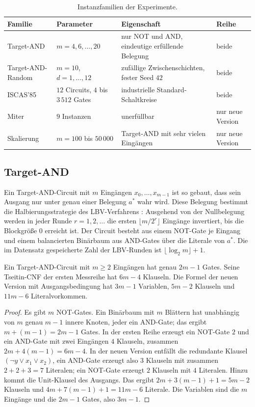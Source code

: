 \begin{table}[!ht]
	\centering
	\small
	\begin{tabularx}{\textwidth}{@{}L{3.3cm}L{3.0cm}YL{2.6cm}@{}}
		\toprule
		Familie & Parameter & Eigenschaft & Reihe \\
		\midrule
		Target-AND & $m=4,6,\ldots,20$ & nur NOT und AND, eindeutige erfüllende Belegung & beide \\
		Target-AND-Random & $m=10$, $d=1,\ldots,12$ & zufällige Zwischenschichten, fester Seed $42$ & beide \\
		ISCAS'85 & $12$ Circuits, $4$ bis $3\,512$ Gates & industrielle Standard-Schaltkreise & beide \\
		Miter & $9$ Instanzen & unerfüllbar & nur neue Version \\
		Skalierung & $m=100$ bis $50\,000$ & Target-AND mit sehr vielen Eingängen & nur neue Version \\
		\bottomrule
	\end{tabularx}
	\caption{Instanzfamilien der Experimente.}
	\label{tab:exp_familien}
\end{table}

\subsection{Target-AND}

Ein Target-AND-Circuit mit $m$ Eingängen $x_0,\ldots,x_{m-1}$ ist so gebaut, dass sein Ausgang nur unter genau einer Belegung $a^\ast$ wahr wird. Diese Belegung bestimmt die Halbierungsstrategie des LBV-Verfahrens \cite{epp2013}: Ausgehend von der Nullbelegung werden in jeder Runde $r=1,2,\ldots$ die ersten $\lfloor m/2^r\rfloor$ Eingänge invertiert, bis die Blockgröße $0$ erreicht ist. Der Circuit besteht aus einem NOT-Gate je Eingang und einem balancierten Binärbaum aus AND-Gates über die Literale von $a^\ast$. Die im Datensatz gespeicherte Zahl der LBV-Runden ist $\lfloor\log_2 m\rfloor+1$.

\begin{satz}
	\label{satz:exp_groesse}
	Ein Target-AND-Circuit mit $m\ge2$ Eingängen hat genau $2m-1$ Gates. Seine Tseitin-CNF der ersten Messreihe hat $6m-4$ Klauseln. Die Formel der neuen Version mit Ausgangsbedingung hat $3m-1$ Variablen, $5m-2$ Klauseln und $11m-6$ Literalvorkommen.
\end{satz}

\begin{proof}
	Es gibt $m$ NOT-Gates. Ein Binärbaum mit $m$ Blättern hat unabhängig von $m$ genau $m-1$ innere Knoten, jeder ein AND-Gate; das ergibt $m+(m-1)=2m-1$ Gates. In der ersten Reihe erzeugt ein NOT-Gate $2$ und ein AND-Gate mit zwei Eingängen $4$ Klauseln, zusammen $2m+4(m-1)=6m-4$. In der neuen Version entfällt die redundante Klausel $(\neg y\vee x_1\vee x_2)$, ein AND-Gate erzeugt also $3$ Klauseln mit zusammen $2+2+3=7$ Literalen; ein NOT-Gate erzeugt $2$ Klauseln mit $4$ Literalen. Hinzu kommt die Unit-Klausel des Ausgangs. Das ergibt $2m+3(m-1)+1=5m-2$ Klauseln und $4m+7(m-1)+1=11m-6$ Literale. Die Variablen sind die $m$ Eingänge und die $2m-1$ Gates, also $3m-1$.
\end{proof}

